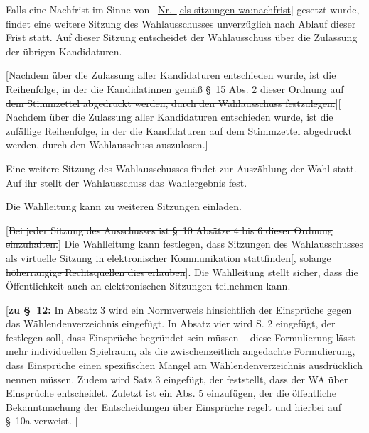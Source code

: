 \documentclass[%
draft,%
multilinesections%
]{fswo}
\newcommand\oldT[1]  {{\color{Gray}[\st{#1}]}}
\newcommand\newT[1]  {{\color{Green}[#1]}}
\newcommand\bemFr[1] {{\color{Red}[#1]}}
\newcommand\oldT[1]{}%
\newcommand\newT[1]{#1}
\newcommand\bemFr[1]{}%
\newcommand\change[2]{\oldT{#1}\newT{#2}}
\newcommand*{\refItem}[1]{\hyperref[#1]{Nr.~\ref{#1}}}
\begin{document}
\begin{contract}
Falls eine Nachfrist im Sinne von ~\refItem{cls-sitzungen-wa:nachfrist} gesetzt wurde, findet eine weitere Sitzung des Wahlausschusses unverzüglich nach Ablauf dieser Frist statt.
Auf dieser Sitzung entscheidet der Wahlausschuss über die Zulassung der übrigen Kandidaturen.
\label{cls-sitzungen-wa:abs-beschluesse-nachfristende}

\change{Nachdem über die Zulassung aller Kandidaturen entschieden wurde, ist die Reihenfolge, in der die Kandidatinnen gemäß \S~15 Abs. 2 dieser Ordnung auf dem Stimmzettel abgedruckt werden, durch den Wahlausschuss festzulegen.}{%
Nachdem über die Zulassung aller Kandidaturen entschieden wurde, ist die zufällige Reihenfolge, in der die Kandidaturen auf dem Stimmzettel abgedruckt werden, durch den Wahlausschuss auszulosen.}

Eine weitere Sitzung des Wahlausschusses findet zur Auszählung der Wahl statt. Auf ihr stellt der Wahlausschuss das Wahlergebnis fest.

Die Wahlleitung kann zu weiteren Sitzungen einladen.

\oldT{Bei jeder Sitzung des Ausschusses ist \S~10 Absätze 4 bis 6 dieser Ordnung einzuhalten.}
Die Wahlleitung kann festlegen, dass Sitzungen des Wahlausschusses als virtuelle Sitzung in elektronischer Kommunikation stattfinden\oldT{, solange höherrangige Rechtsquellen dies erlauben}.
Die Wahlleitung stellt sicher, dass die Öffentlichkeit auch an elektronischen Sitzungen teilnehmen kann.
\end{contract}

\bemFr{\textbf{zu \S~12:}
In Absatz 3 wird ein Normverweis hinsichtlich der Einsprüche gegen das Wählendenverzeichnis eingefügt.
In Absatz vier wird S. 2 eingefügt, der festlegen soll, dass Einsprüche begründet sein müssen
– diese Formulierung lässt mehr individuellen Spielraum, als die zwischenzeitlich angedachte Formulierung,
dass Einsprüche einen spezifischen Mangel am Wählendenverzeichnis ausdrücklich nennen müssen.
Zudem wird Satz 3 eingefügt, der feststellt, dass der WA über Einsprüche entscheidet.
Zuletzt ist ein Abs. 5 einzufügen, der die öffentliche Bekanntmachung der Entscheidungen über Einsprüche regelt und hierbei auf \S~10a verweist.
}
\end{document}
